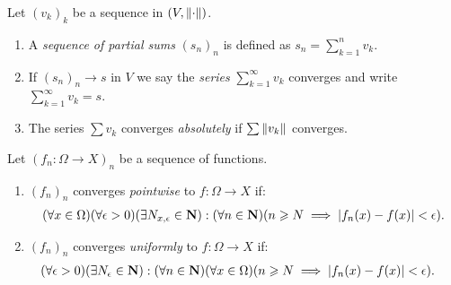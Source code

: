         \begin{definition}
            Let $(v_k)_k$ be a sequence in $(V,\left\lVert \cdot \right\rVert)$.
            \begin{enumerate}[label = (\arabic*),itemsep=1pt,topsep=3pt]
                \item A \textit{sequence of partial sums} $(s_n)_n$ is defined as $s_n = \sum_{k = 1}^n v_k$.
                \item If $(s_n)_n \rightarrow s$ in $V$ we say the \textit{series} $\sum_{k = 1}^\infty v_k$ converges and write $\sum_{k = 1}^\infty v_k = s$.
                \item The series $\sum v_k$ converges \textit{absolutely} if $\sum \left\lVert v_k \right\rVert$ converges.
            \end{enumerate}
        \end{definition}

    \begin{center}
    \end{center}

    \begin{definition}
        Let $(f_n:\Omega \rightarrow X)_n$ be a sequence of functions.
        \begin{enumerate}[label = (\arabic*),itemsep=1pt,topsep=3pt]
            \item $(f_n)_n$ converges \textit{pointwise} to $f:\Omega \rightarrow X$ if:
                \begin{equation*}
                \begin{split}
                    (\forall x \in \Omega)(\forall \epsilon > 0)(\exists N_{x,\epsilon} \in \mathbf{N}) : (\forall n \in \mathbf{N})( n \geqslant N \implies |f_n(x) - f(x)| < \epsilon).
                \end{split}
                \end{equation*}

            \item $(f_n)_n$ converges \textit{uniformly} to $f:\Omega \rightarrow X$ if:
                \begin{equation*}
                \begin{split}
                        (\forall \epsilon > 0)(\exists N_\epsilon \in \mathbf{N}) : (\forall n \in \mathbf{N})(\forall x \in \Omega)(n \geqslant N &\implies |f_n(x) - f(x)| < \epsilon).
                \end{split}
                \end{equation*}
        \end{enumerate}
    \end{definition}

